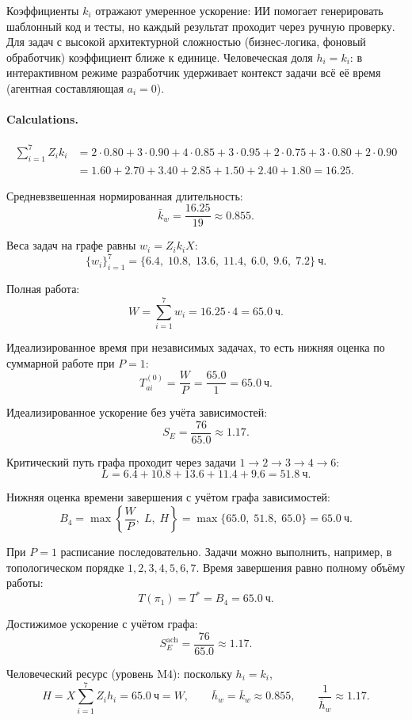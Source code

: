 \documentclass[12pt,a4paper]{article}
\theoremstyle{definition}
\begin{document}
Коэффициенты $k_i$ отражают умеренное ускорение: ИИ помогает генерировать шаблонный код и тесты, но каждый результат проходит через ручную проверку. Для задач с высокой архитектурной сложностью (бизнес-логика, фоновый обработчик) коэффициент ближе к единице. Человеческая доля $h_i = k_i$: в интерактивном режиме разработчик удерживает контекст задачи всё её время (агентная составляющая $a_i = 0$).

\paragraph{Calculations.}
\begin{align*}
  \sum_{i=1}^{7} Z_i k_i &= 2{\cdot}0.80 + 3{\cdot}0.90 + 4{\cdot}0.85 + 3{\cdot}0.95 + 2{\cdot}0.75 + 3{\cdot}0.80 + 2{\cdot}0.90 \\
  &= 1.60 + 2.70 + 3.40 + 2.85 + 1.50 + 2.40 + 1.80 = 16.25.
\end{align*}

Средневзвешенная нормированная длительность:
\[
  \bar{k}_w = \frac{16.25}{19} \approx 0.855.
\]

Веса задач на графе равны $w_i = Z_i k_i X$:
\[
  \{w_i\}_{i=1}^{7} = \{6.4,\; 10.8,\; 13.6,\; 11.4,\; 6.0,\; 9.6,\; 7.2\}~\text{ч}.
\]

Полная работа:
\[
  W = \sum_{i=1}^{7} w_i = 16.25 \cdot 4 = 65.0~\text{ч}.
\]

Идеализированное время при независимых задачах, то есть нижняя оценка по суммарной работе при $P = 1$:
\[
  T_{ai}^{(0)} = \frac{W}{P} = \frac{65.0}{1} = 65.0~\text{ч}.
\]

Идеализированное ускорение без учёта зависимостей:
\[
  S_E = \frac{76}{65.0} \approx 1.17.
\]

Критический путь графа проходит через задачи $1 \to 2 \to 3 \to 4 \to 6$:
\[
  L = 6.4 + 10.8 + 13.6 + 11.4 + 9.6 = 51.8~\text{ч}.
\]

Нижняя оценка времени завершения с учётом графа зависимостей:
\[
  B_4 = \max\left\{\frac{W}{P},\; L,\; H\right\} = \max\{65.0,\; 51.8,\;65.0\} = 65.0~\text{ч}.
\]

При $P=1$ расписание последовательно. Задачи можно выполнить, например, в топологическом порядке $1,2,3,4,5,6,7$. Время завершения равно полному объёму работы:
\[
  T(\pi_1)=T^{*}=B_4=65.0~\text{ч}.
\]

Достижимое ускорение с учётом графа:
\[
  S_E^{\text{ach}} = \frac{76}{65.0} \approx 1.17.
\]

Человеческий ресурс (уровень M4): поскольку $h_i = k_i$,
\[
  H = X \sum_{i=1}^{7} Z_i h_i = 65.0~\text{ч} = W,
  \qquad
  \bar{h}_w = \bar{k}_w \approx 0.855,
  \qquad
  \frac{1}{\bar{h}_w} \approx 1.17.
\]
\end{document}
